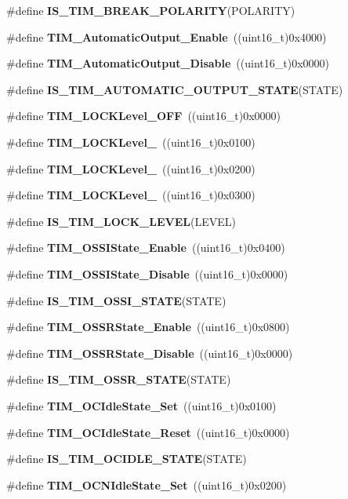 \begin{DoxyCompactItemize}
\item 
\#define \textbf{ I\+S\+\_\+\+T\+I\+M\+\_\+\+B\+R\+E\+A\+K\+\_\+\+P\+O\+L\+A\+R\+I\+TY}(P\+O\+L\+A\+R\+I\+TY)
\item 
\#define \textbf{ T\+I\+M\+\_\+\+Automatic\+Output\+\_\+\+Enable}~((uint16\+\_\+t)0x4000)
\item 
\#define \textbf{ T\+I\+M\+\_\+\+Automatic\+Output\+\_\+\+Disable}~((uint16\+\_\+t)0x0000)
\item 
\#define \textbf{ I\+S\+\_\+\+T\+I\+M\+\_\+\+A\+U\+T\+O\+M\+A\+T\+I\+C\+\_\+\+O\+U\+T\+P\+U\+T\+\_\+\+S\+T\+A\+TE}(S\+T\+A\+TE)
\item 
\#define \textbf{ T\+I\+M\+\_\+\+L\+O\+C\+K\+Level\+\_\+\+O\+FF}~((uint16\+\_\+t)0x0000)
\item 
\#define \textbf{ T\+I\+M\+\_\+\+L\+O\+C\+K\+Level\+\_}~((uint16\+\_\+t)0x0100)
\item 
\#define \textbf{ T\+I\+M\+\_\+\+L\+O\+C\+K\+Level\+\_}~((uint16\+\_\+t)0x0200)
\item 
\#define \textbf{ T\+I\+M\+\_\+\+L\+O\+C\+K\+Level\+\_}~((uint16\+\_\+t)0x0300)
\item 
\#define \textbf{ I\+S\+\_\+\+T\+I\+M\+\_\+\+L\+O\+C\+K\+\_\+\+L\+E\+V\+EL}(L\+E\+V\+EL)
\item 
\#define \textbf{ T\+I\+M\+\_\+\+O\+S\+S\+I\+State\+\_\+\+Enable}~((uint16\+\_\+t)0x0400)
\item 
\#define \textbf{ T\+I\+M\+\_\+\+O\+S\+S\+I\+State\+\_\+\+Disable}~((uint16\+\_\+t)0x0000)
\item 
\#define \textbf{ I\+S\+\_\+\+T\+I\+M\+\_\+\+O\+S\+S\+I\+\_\+\+S\+T\+A\+TE}(S\+T\+A\+TE)
\item 
\#define \textbf{ T\+I\+M\+\_\+\+O\+S\+S\+R\+State\+\_\+\+Enable}~((uint16\+\_\+t)0x0800)
\item 
\#define \textbf{ T\+I\+M\+\_\+\+O\+S\+S\+R\+State\+\_\+\+Disable}~((uint16\+\_\+t)0x0000)
\item 
\#define \textbf{ I\+S\+\_\+\+T\+I\+M\+\_\+\+O\+S\+S\+R\+\_\+\+S\+T\+A\+TE}(S\+T\+A\+TE)
\item 
\#define \textbf{ T\+I\+M\+\_\+\+O\+C\+Idle\+State\+\_\+\+Set}~((uint16\+\_\+t)0x0100)
\item 
\#define \textbf{ T\+I\+M\+\_\+\+O\+C\+Idle\+State\+\_\+\+Reset}~((uint16\+\_\+t)0x0000)
\item 
\#define \textbf{ I\+S\+\_\+\+T\+I\+M\+\_\+\+O\+C\+I\+D\+L\+E\+\_\+\+S\+T\+A\+TE}(S\+T\+A\+TE)
\item 
\#define \textbf{ T\+I\+M\+\_\+\+O\+C\+N\+Idle\+State\+\_\+\+Set}~((uint16\+\_\+t)0x0200)

\end{DoxyCompactItemize}
